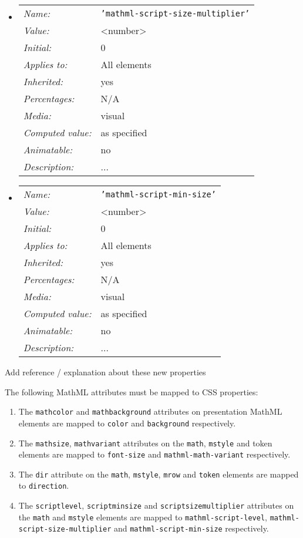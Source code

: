 \begin{itemize}
\item \begin{tabular}{ll}\label{CSSScriptSizeMultiplier}
  \emph{Name:} & {\tt 'mathml-script-size-multiplier'} \\
  \emph{Value:} & \textless number\textgreater \\
  \emph{Initial:} & 0 \\
  \emph{Applies to:} & All elements \\
  \emph{Inherited:} & yes \\
  \emph{Percentages:} & N/A \\
  \emph{Media:} & visual \\
  \emph{Computed value:} & as specified \\
  \emph{Animatable:} & no \\
  \emph{Description:} & ...
\end{tabular}

\item \begin{tabular}{ll}\label{CSSScriptSizeMinSize}
  \emph{Name:} & {\tt 'mathml-script-min-size'} \\
  \emph{Value:} & \textless number\textgreater \\
  \emph{Initial:} & 0 \\
  \emph{Applies to:} & All elements \\
  \emph{Inherited:} & yes \\
  \emph{Percentages:} & N/A \\
  \emph{Media:} & visual \\
  \emph{Computed value:} & as specified \\
  \emph{Animatable:} & no \\
  \emph{Description:} & ...
\end{tabular}

\end{itemize}

Add reference / explanation about these new properties 

The following MathML attributes must be mapped to CSS properties:
%
\begin{enumerate}
\item The {\tt mathcolor} and {\tt mathbackground} attributes on presentation
  MathML elements are mapped to {\tt color} and {\tt background} respectively.
\item The {\tt mathsize}, {\tt mathvariant} attributes on the {\tt math},
  {\tt mstyle} and token elements are mapped to {\tt font-size} and
  {\tt mathml-math-variant} respectively.
\item The {\tt dir} attribute on the {\tt math}, {\tt mstyle}, {\tt mrow} and
  {\tt token} elements are mapped to {\tt direction}.
\item The {\tt scriptlevel}, {\tt scriptminsize} and {\tt scriptsizemultiplier}
  attributes on the {\tt math} and {\tt mstyle} elements are mapped to
  {\tt mathml-script-level}, {\tt mathml-script-size-multiplier}
  and {\tt mathml-script-min-size} respectively.
\end{enumerate}

